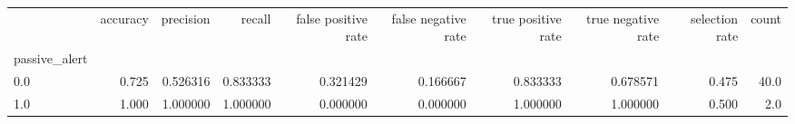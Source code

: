 \begin{tabular}{lrrrrrrrrr}
\toprule
{} &  accuracy &  precision &    recall &  false positive rate &  false negative rate &  true positive rate &  true negative rate &  selection rate &  count \\
passive\_alert &           &            &           &                      &                      &                     &                     &                 &        \\
\midrule
0.0           &     0.725 &   0.526316 &  0.833333 &             0.321429 &             0.166667 &            0.833333 &            0.678571 &           0.475 &   40.0 \\
1.0           &     1.000 &   1.000000 &  1.000000 &             0.000000 &             0.000000 &            1.000000 &            1.000000 &           0.500 &    2.0 \\
\bottomrule
\end{tabular}
